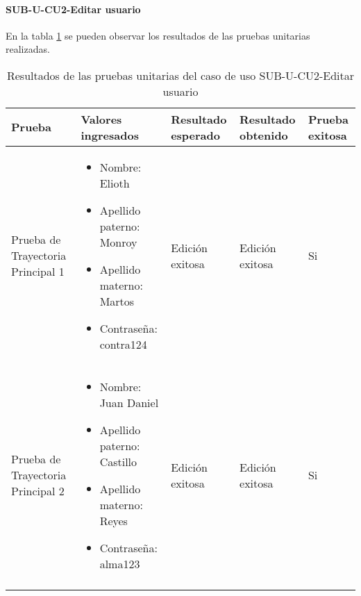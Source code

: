 \paragraph{SUB-U-CU2-Editar usuario}\label{SUB-U-CU2:Pruebas}
En la tabla \ref{pruebas_unitarias_sub-u-cu2} se pueden observar los resultados de las pruebas unitarias realizadas.
\begin{longtable}{|M{2cm}| M{4.5cm}|M{3cm}|M{3cm}|M{1.5cm}|}
	\hline
	\textbf{Prueba} & \textbf{Valores ingresados} & \textbf{Resultado esperado} & \textbf{Resultado obtenido} & \textbf{Prueba exitosa} \\ \hline
	Prueba de Trayectoria Principal 1& 
	\begin{itemize}
		\item Nombre: Elioth
		\item Apellido paterno: Monroy
		\item Apellido materno: Martos
		\item Contraseña: contra124
	\end{itemize}
	& Edición exitosa
	& Edición exitosa & Si \\ \hline

	Prueba de Trayectoria Principal 2& 
	\begin{itemize}
		\item Nombre: Juan Daniel
		\item Apellido paterno: Castillo
		\item Apellido materno: Reyes
		\item Contraseña: alma123
	\end{itemize}
	& Edición exitosa
	& Edición exitosa & Si \\ \hline

	\caption{Resultados de las pruebas unitarias del caso de uso SUB-U-CU2-Editar usuario}
	\label{pruebas_unitarias_sub-u-cu2}
\end{longtable}